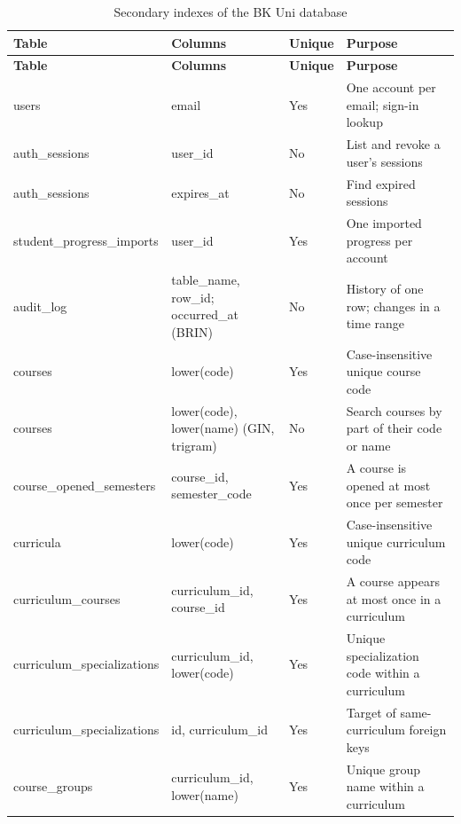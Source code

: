 \begingroup\small
\begin{longtable}{|p{}|p{}|p{}|p{}|}
\caption{Secondary indexes of the BK Uni database}\label{tab:db-indexes}\\
\hline
\textbf{Table} & \textbf{Columns} & \textbf{Unique} & \textbf{Purpose} \\
\hline
\endfirsthead
\hline
\textbf{Table} & \textbf{Columns} & \textbf{Unique} & \textbf{Purpose} \\
\hline
\endhead
users & email & Yes & One account per email; sign-in lookup \\
\hline
auth\_\allowbreak{}sessions & user\_\allowbreak{}id & No & List and revoke a user's sessions \\
\hline
auth\_\allowbreak{}sessions & expires\_\allowbreak{}at & No & Find expired sessions \\
\hline
student\_\allowbreak{}progress\_\allowbreak{}imports & user\_\allowbreak{}id & Yes & One imported progress per account \\
\hline
audit\_\allowbreak{}log & table\_\allowbreak{}name, row\_\allowbreak{}id; occurred\_\allowbreak{}at (BRIN) & No & History of one row; changes in a time range \\
\hline
courses & lower(code) & Yes & Case-insensitive unique course code \\
\hline
courses & lower(code), lower(name) (GIN, trigram) & No & Search courses by part of their code or name \\
\hline
course\_\allowbreak{}opened\_\allowbreak{}semesters & course\_\allowbreak{}id, semester\_\allowbreak{}code & Yes & A course is opened at most once per semester \\
\hline
curricula & lower(code) & Yes & Case-insensitive unique curriculum code \\
\hline
curriculum\_\allowbreak{}courses & curriculum\_\allowbreak{}id, course\_\allowbreak{}id & Yes & A course appears at most once in a curriculum \\
\hline
curriculum\_\allowbreak{}specializations & curriculum\_\allowbreak{}id, lower(code) & Yes & Unique specialization code within a curriculum \\
\hline
curriculum\_\allowbreak{}specializations & id, curriculum\_\allowbreak{}id & Yes & Target of same-curriculum foreign keys \\
\hline
course\_\allowbreak{}groups & curriculum\_\allowbreak{}id, lower(name) & Yes & Unique group name within a curriculum \\

\end{longtable}
